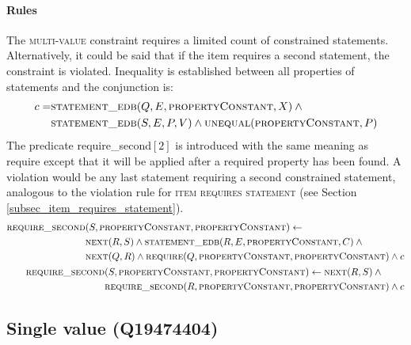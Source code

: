 \documentclass[hyperref,bachelorofscience,fleqn]{cgvpub}
\begin{document}
\paragraph{Rules}
The \textsc{multi-value} constraint requires a limited count of constrained statements. Alternatively, it could be said that if the item requires a second statement, the constraint is violated. Inequality is established between all properties of statements and the conjunction is:
\begin{equation}
\begin{split}
c = &\textsc{statement\_edb}(Q, E, \textsc{propertyConstant}, X) \wedge{} \\
&\textsc{statement\_edb}(S, E, P, V) \wedge \textsc{unequal}(\textsc{propertyConstant}, P)
\end{split}
\end{equation}
The predicate require\_second\([2]\) is introduced with the same meaning as require except that it will be applied after a required property has been found. A violation would be any last statement requiring a second constrained statement, analogous to the violation rule for \textsc{item requires statement} (see Section \ref{subsec_item_requires_statement}).
\begin{align}
\begin{split}
\textsc{require\_second}&(S, \textsc{propertyConstant}, \textsc{propertyConstant}) \leftarrow \\
&\textsc{next}(R, S) \wedge \textsc{statement\_edb}(R, E, \textsc{propertyConstant}, C) \wedge{} \\
&\textsc{next}(Q, R) \wedge \textsc{require}(Q, \textsc{propertyConstant}, \textsc{propertyConstant})  \wedge c
\end{split}\\
\begin{split}
\textsc{require\_second}&(S, \textsc{propertyConstant}, \textsc{propertyConstant}) \leftarrow \textsc{next}(R, S) \wedge{} \\
&\textsc{require\_second}(R, \textsc{propertyConstant}, \textsc{propertyConstant}) \wedge c
\end{split}
\end{align}

\subsection{Single value (Q19474404)}\label{subsec_single_value}
\end{document}
